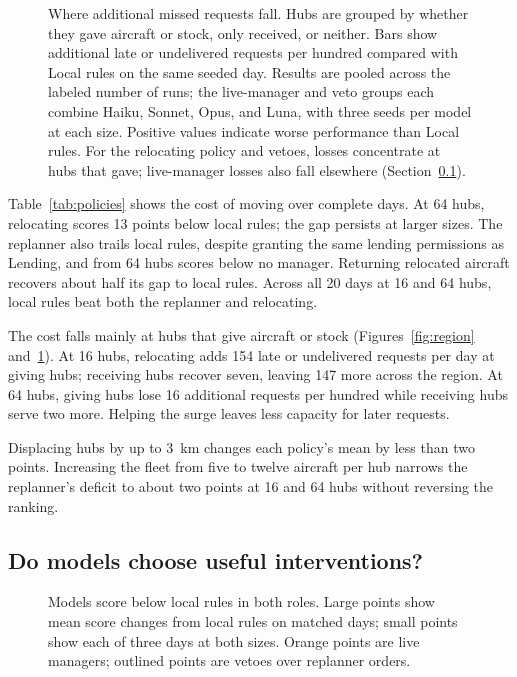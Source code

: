 \documentclass[letterpaper,10pt,conference]{ieeeconf}
\begin{document}
\begin{figure}[t]
\centering
\resizebox{\columnwidth}{!}{}
\caption{Where additional missed requests fall. Hubs are grouped by whether
they gave aircraft or stock, only received, or neither. Bars show additional
late or undelivered requests per hundred compared with Local rules on the
same seeded day. Results are pooled across the labeled number of runs;
the live-manager and veto groups each combine Haiku, Sonnet, Opus, and Luna,
with three seeds per model at each size.
Positive values indicate worse performance than Local rules.
For the relocating policy and vetoes, losses concentrate at hubs that gave;
live-manager losses also fall elsewhere (Section~\ref{sec:models}).}
\label{fig:loss}
\end{figure}

Table~\ref{tab:policies} shows the cost of moving over complete days.
At 64 hubs, relocating scores 13 points below local rules; the gap persists
at larger sizes. The replanner also trails local rules, despite granting
the same lending permissions as Lending, and from 64 hubs scores below
no manager. Returning relocated aircraft recovers about half its gap to
local rules. Across all 20 days at 16 and 64 hubs, local rules beat both
the replanner and relocating.

The cost falls mainly at hubs that give aircraft or stock
(Figures~\ref{fig:region} and~\ref{fig:loss}). At 16 hubs, relocating adds
154 late or undelivered requests per day at giving hubs; receiving hubs
recover seven, leaving 147 more across the region. At 64 hubs, giving
hubs lose 16 additional requests per hundred while receiving hubs serve
two more. Helping the surge leaves less capacity for later requests.

Displacing hubs by up to 3~km changes each policy's mean by less than two
points. Increasing the fleet from five to twelve aircraft per hub narrows
the replanner's deficit to about two points at 16 and 64 hubs without
reversing the ranking.

\subsection{Do models choose useful interventions?}
\label{sec:models}

\begin{figure}[t]
\centering
\resizebox{\columnwidth}{!}{}
\caption{Models score below local rules in both roles. Large points show
mean score changes from local rules on matched days; small points show
each of three days at both sizes. Orange points are live managers;
outlined points are vetoes over replanner orders.}
\label{fig:models}
\end{figure}
\end{document}
